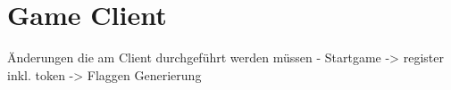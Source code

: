 \section{Game Client} \label{sec:Game_Client}

Änderungen die am Client durchgeführt werden müssen
- Startgame -> register inkl. token
-> Flaggen Generierung